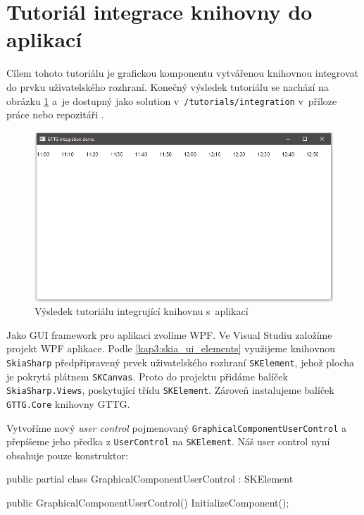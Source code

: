 \newpage
\section{Tutoriál integrace knihovny do aplikací}
Cílem tohoto tutoriálu je grafickou komponentu vytvářenou knihovnou integrovat do prvku uživatelského rozhraní. Konečný výsledek tutoriálu se nachází na obrázku \ref{fig:kap5:integration_demo} a~je dostupný jako solution v~\texttt{/tutorials/integration} v~příloze práce nebo repozitáři \cite{GTTG.Tutorials.Integration}. 

\begin{figure}[!hbt]
	\centering
	\includegraphics[width=.8\textwidth]{../img/kap5_tutorials_integration_result}
	\caption{Výsledek tutoriálu integrující knihovnu s~aplikací}
	\label{fig:kap5:integration_demo}
\end{figure}

Jako GUI framework pro aplikaci zvolíme WPF. Ve Visual Studiu založíme projekt WPF aplikace. Podle \ref{kap3:skia_ui_elements} využijeme knihovnou \texttt{SkiaSharp} předpřipravený prvek uživatelského rozhraní \texttt{SKElement}, jehož plocha je pokrytá plátnem \texttt{SKCanvas}. Proto do projektu přidáme balíček \texttt{SkiaSharp.Views}, poskytující třídu \texttt{SKElement}. Zároveň instalujeme balíček \texttt{GTTG.Core} knihovny GTTG. 

Vytvoříme nový \textit{user control} pojmenovaný \texttt{GraphicalComponentUserControl} a přepíšeme jeho předka z \texttt{UserControl} na \texttt{SKElement}. Náš user control nyní obsahuje pouze konstruktor:

\begin{csharpcode}
public partial class GraphicalComponentUserControl : SKElement {

        public GraphicalComponentUserControl() {
            InitializeComponent();
        }
}
\end{csharpcode}

